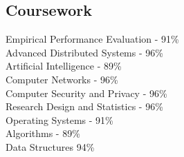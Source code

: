 \documentclass[]{chowes-resume}
\begin{document}
\begin{minipage}[t]{0.33\textwidth}
\sectionsep
\sectionsep
\subsection{Coursework}
Empirical Performance Evaluation - 91\%\\
Advanced Distributed Systems - 96\%\\
Artificial Intelligence - 89\%\\
Computer Networks - 96\%\\
Computer Security and Privacy - 96\%\\
Research Design and Statistics - 96\%\\
Operating Systems - 91\%\\
Algorithms - 89\%\\
Data Structures 94\%\\
\sectionsep


%
%

\end{minipage} 
\hfill
\end{document}
